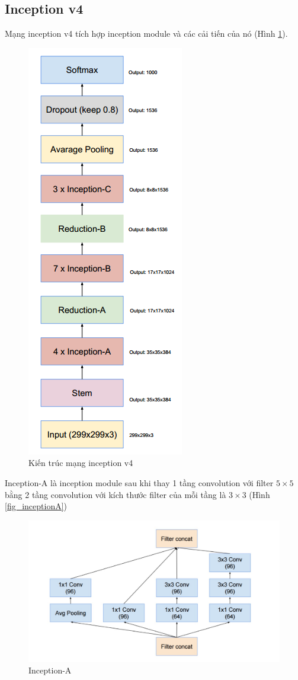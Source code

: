 \documentclass[a4paper,12pt]{report}
\begin{document}
\subsection{Inception v4}
Mạng inception v4 tích hợp inception module và các cải tiến của nó (Hình \ref{fig_inceptionv4}).
\begin{figure}[H]
\centering 
\includegraphics[scale=0.7]{inceptionv4.png}
\caption{Kiến trúc mạng inception v4}
\label{fig_inceptionv4}
\end{figure}
\par Inception-A là inception module sau khi thay 1 tầng convolution với filter $5\times 5$ bằng 2 tầng convolution với kích thước filter của mỗi tầng là $3 \times 3$ (Hình \ref{fig_inceptionA})
\begin{figure}[H]
\centering 
\includegraphics[scale=0.4]{inceptionA.jpg}
\caption{Inception-A}
\label{fig_inceptionA }
\end{figure}
\end{document}
